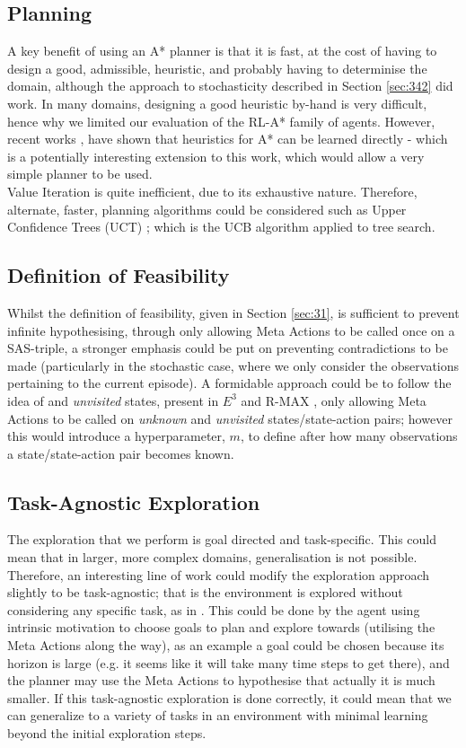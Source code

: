\subsection{Planning}
A key benefit of using an A* planner is that it is fast, at the cost of having to design a good, admissible, heuristic, and probably having to determinise the domain, although the approach to stochasticity described in Section \ref{sec:342} did work. In many domains, designing a good heuristic by-hand is very difficult, hence why we limited our evaluation of the RL-A* family of agents. However, recent works \cite{DBLP:journals/corr/abs-2107-02603}, have shown that heuristics for A* can be learned directly - which is a potentially interesting extension to this work, which would allow a very simple planner to be used.
\\Value Iteration is quite inefficient, due to its exhaustive nature. Therefore, alternate, faster, planning algorithms could be considered such as Upper Confidence Trees (UCT) \cite{10.1007/11871842_29}; which is the UCB algorithm \cite{auer2002finite} applied to tree search.
\subsection{Definition of Feasibility}
Whilst the definition of feasibility, given in Section \ref{sec:31}, is sufficient to prevent infinite hypothesising, through only allowing Meta Actions to be called once on a SAS-triple, a stronger emphasis could be put on preventing contradictions to be made (particularly in the stochastic case, where we only consider the observations pertaining to the current episode). A formidable approach could be to follow the idea of  and \textit{unvisited} states, present in $E^3$ \cite{Kearns+Singh:2002} and R-MAX \cite{10.1162/153244303765208377}, only allowing Meta Actions to be called on \textit{unknown} and \textit{unvisited} states/state-action pairs; however this would introduce a hyperparameter, $m$, to define after how many observations a state/state-action pair becomes known.
\subsection{Task-Agnostic Exploration}
The exploration that we perform is goal directed and task-specific. This could mean that in larger, more complex domains, generalisation is not possible. Therefore, an interesting line of work could modify the exploration approach slightly to be task-agnostic; that is the environment is explored without considering any specific task, as in \cite{plan2explore}. This could be done by the agent using intrinsic motivation to choose goals to plan and explore towards (utilising the Meta Actions along the way), as an example a goal could be chosen because its horizon is large (e.g. it seems like it will take many time steps to get there), and the planner may use the Meta Actions to hypothesise that actually it is much smaller. If this task-agnostic exploration is done correctly, it could mean that we can generalize to a variety of tasks in an environment with minimal learning beyond the initial exploration steps.

